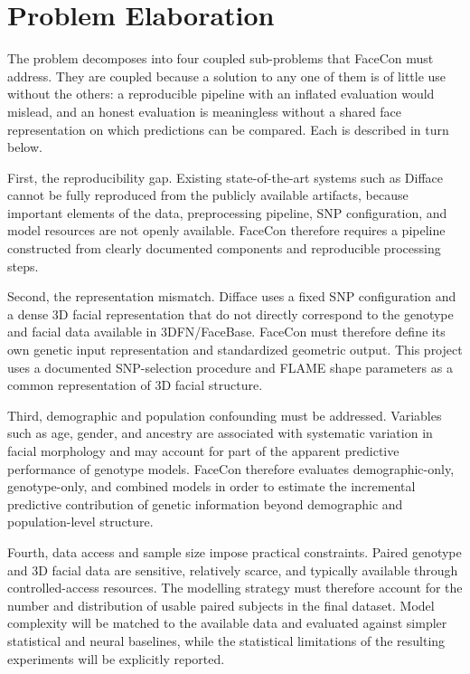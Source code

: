 \section{Problem Elaboration}
The problem decomposes into four coupled sub-problems that FaceCon must address. They are coupled because a solution to any one of them is of little use without the others: a reproducible pipeline with an inflated evaluation would mislead, and an honest evaluation is meaningless without a shared face representation on which predictions can be compared. Each is described in turn below.

First, the reproducibility gap. Existing state-of-the-art systems such as Difface cannot be fully reproduced from the publicly available artifacts, because important elements of the data, preprocessing pipeline, SNP configuration, and model resources are not openly available. FaceCon therefore requires a pipeline constructed from clearly documented components and reproducible processing steps.

Second, the representation mismatch. Difface uses a fixed SNP configuration and a dense 3D facial representation that do not directly correspond to the genotype and facial data available in 3DFN/FaceBase. FaceCon must therefore define its own genetic input representation and standardized geometric output. This project uses a documented SNP-selection procedure and FLAME shape parameters as a common representation of 3D facial structure.

Third, demographic and population confounding must be addressed. Variables such as age, gender, and ancestry are associated with systematic variation in facial morphology and may account for part of the apparent predictive performance of genotype models. FaceCon therefore evaluates demographic-only, genotype-only, and combined models in order to estimate the incremental predictive contribution of genetic information beyond demographic and population-level structure.

Fourth, data access and sample size impose practical constraints. Paired genotype and 3D facial data are sensitive, relatively scarce, and typically available through controlled-access resources. The modelling strategy must therefore account for the number and distribution of usable paired subjects in the final dataset. Model complexity will be matched to the available data and evaluated against simpler statistical and neural baselines, while the statistical limitations of the resulting experiments will be explicitly reported.

